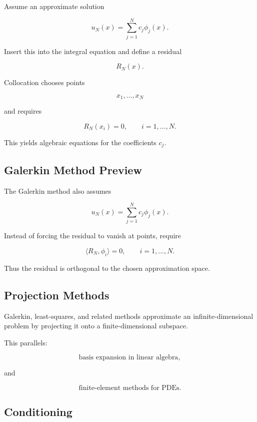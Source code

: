 Assume an approximate solution

\[
\boxed{
u_N(x)
=
\sum_{j=1}^{N}
c_j\phi_j(x).
}
\]

Insert this into the integral equation and define a residual

\[
\boxed{
R_N(x).
}
\]

Collocation chooses points

\[
x_1,\ldots,x_N
\]

and requires

\[
\boxed{
R_N(x_i)=0,
\qquad
i=1,\ldots,N.
}
\]

This yields algebraic equations for the coefficients \(c_j\).

\subsection{Galerkin Method Preview}
\label{subsec:galerkin-integral-equations}

The Galerkin method also assumes

\[
u_N(x)
=
\sum_{j=1}^{N}
c_j\phi_j(x).
\]

Instead of forcing the residual to vanish at points, require

\[
\boxed{
\langle
R_N,
\phi_i
\rangle
=
0,
\qquad
i=1,\ldots,N.
}
\]

Thus the residual is orthogonal to the chosen approximation space.

\subsection{Projection Methods}
\label{subsec:projection-methods-integral-equations}

Galerkin, least-squares, and related methods approximate an
infinite-dimensional problem by projecting it onto a finite-dimensional
subspace.

This parallels:

\[
\boxed{
\text{basis expansion in linear algebra},
}
\]

and

\[
\boxed{
\text{finite-element methods for PDEs}.
}
\]

\subsection{Conditioning}
\label{subsec:integral-equation-conditioning}

